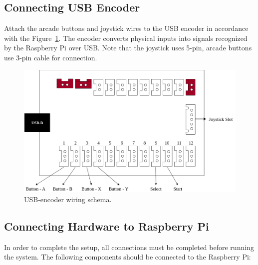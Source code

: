 \subsection{Connecting USB Encoder}
\label{subsec:connecting_usb_encoder}
Attach the arcade buttons and joystick wires to the USB encoder in accordance with the Figure~\ref{fig:usb_encoder_layout}. The encoder converts physical inputs into signals recognized by the Raspberry Pi over USB.
Note that the joystick uses 5-pin, arcade buttons use 3-pin cable for connection.
\\
\begin{figure}[htb]
  \centering
  \includegraphics[scale=0.36]{F_Figures/usb_encoder_layout.png}
  \caption{USB-encoder wiring schema.}
  \label{fig:usb_encoder_layout}
\end{figure}

\subsection{Connecting Hardware to Raspberry Pi}
\label{subsec:wiring_raspberry_pi}
In order to complete the setup, all connections must be completed before running the system. The following components should be connected to the Raspberry Pi:

